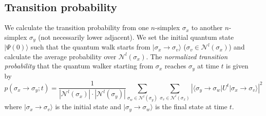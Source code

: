 \documentclass[10pt, letterpaper]{article}
\begin{document}
\subsection{Transition probability}
We calculate the transition probability from one $n$-simplex $\sigma_x$ to another $n$-simplex $\sigma_y$ (not necessarily lower adjacent). We set the initial quantum state $\vert\Psi(0)\rangle$ such that the quantum walk starts from $\vert\sigma_x\to\sigma_v\rangle$ ($\sigma_v\in \mathcal{N}^{l}(\sigma_x)$) and calculate the average probability over $\mathcal{N}^{l}(\sigma_x)$. The \textit{normalized transition probability} that the quantum walker starting from $\sigma_x$ reaches $\sigma_y$ at time $t$ is given by
\begin{equation} \label{transitionprob1}
p(\sigma_x\to\sigma_y; t) = \frac{1}{\left|\mathcal{N}^{l}(\sigma_x)\right| \cdot \left|\mathcal{N}^{l}(\sigma_y)\right|} \sum_{\sigma_w\in \mathcal{N}^{l}(\sigma_y)} \sum_{\sigma_v\in \mathcal{N}^{l}(\sigma_x)} \left| \langle\sigma_y\to\sigma_w \vert U^{t} \vert \sigma_x\to\sigma_v\rangle \right|^2
\end{equation}
where $\vert\sigma_x\to\sigma_v\rangle$ is the initial state and $\vert\sigma_y\to\sigma_w\rangle$ is the final state at time $t$.
\end{document}
